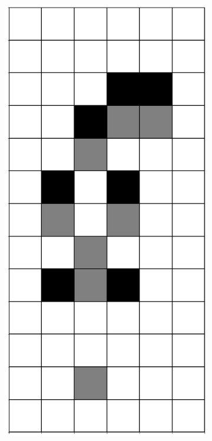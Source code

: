 \documentclass[12pt]{article}
\numberwithin{figure}{section} %
\begin{document}
\begin{figure}[H]
\begin{subfigure}{0.3\textwidth}
     		\subcaption{}
   	\end{subfigure}
     	\begin{subfigure}{0.3\textwidth}
     		\centering
     		\includegraphics[angle=270,width=\linewidth]{Section4/9.1}

\end{subfigure}
\end{figure}
\end{document}
